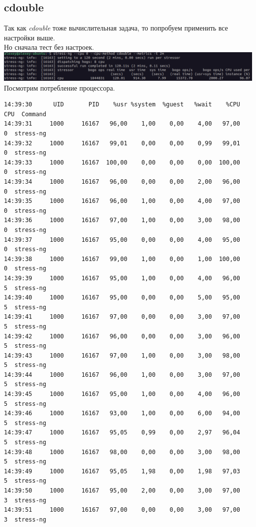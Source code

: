 \subsection{cdouble}
Так как \textit{cdouble} тоже вычислительная задача, то попробуем применить все настройки выше.\\
Но сначала тест без настроек. \\
\includegraphics[width=\textwidth]{image/cdouble-1.png}
Посмотрим потребление процессора.\\
\begin{verbatim}
14:39:30      UID       PID    %usr %system  %guest   %wait    %CPU   CPU  Command
14:39:31     1000     16167   96,00    1,00    0,00    4,00   97,00     0  stress-ng
14:39:32     1000     16167   99,01    0,00    0,00    0,99   99,01     0  stress-ng
14:39:33     1000     16167  100,00    0,00    0,00    0,00  100,00     0  stress-ng
14:39:34     1000     16167   96,00    0,00    0,00    2,00   96,00     0  stress-ng
14:39:35     1000     16167   96,00    1,00    0,00    4,00   97,00     0  stress-ng
14:39:36     1000     16167   97,00    1,00    0,00    3,00   98,00     0  stress-ng
14:39:37     1000     16167   95,00    0,00    0,00    4,00   95,00     0  stress-ng
14:39:38     1000     16167   99,00    1,00    0,00    1,00  100,00     0  stress-ng
14:39:39     1000     16167   95,00    1,00    0,00    4,00   96,00     5  stress-ng
14:39:40     1000     16167   95,00    0,00    0,00    5,00   95,00     5  stress-ng
14:39:41     1000     16167   97,00    0,00    0,00    3,00   97,00     5  stress-ng
14:39:42     1000     16167   96,00    0,00    0,00    3,00   96,00     5  stress-ng
14:39:43     1000     16167   97,00    1,00    0,00    3,00   98,00     5  stress-ng
14:39:44     1000     16167   96,00    1,00    0,00    3,00   97,00     5  stress-ng
14:39:45     1000     16167   95,00    1,00    0,00    4,00   96,00     5  stress-ng
14:39:46     1000     16167   93,00    1,00    0,00    6,00   94,00     5  stress-ng
14:39:47     1000     16167   95,05    0,99    0,00    2,97   96,04     5  stress-ng
14:39:48     1000     16167   98,00    0,00    0,00    3,00   98,00     5  stress-ng
14:39:49     1000     16167   95,05    1,98    0,00    1,98   97,03     5  stress-ng
14:39:50     1000     16167   95,00    2,00    0,00    3,00   97,00     3  stress-ng
14:39:51     1000     16167   97,00    0,00    0,00    3,00   97,00     3  stress-ng

\end{verbatim}
